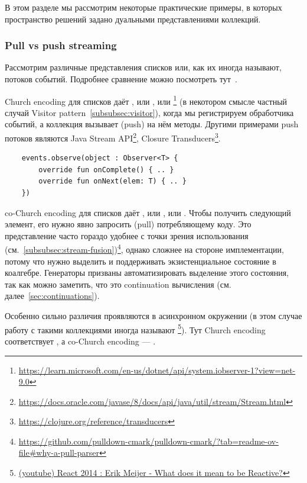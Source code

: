 В этом разделе мы рассмотрим некоторые практические примеры, в которых пространство решений задано дуальными представлениями коллекций.

\subsubsection{Pull vs push streaming} \label{subsubsec:push-pull}

Рассмотрим различные представления списков или, как их иногда называют, потоков событий.
Подробнее сравнение можно посмотреть тут~\cite[параграф 3]{kiselyov2017stream}.

Church encoding для списков даёт , или , или \footnote{\url{https://learn.microsoft.com/en-us/dotnet/api/system.iobserver-1?view=net-9.0}} (в некотором смысле частный случай Visitor pattern~\ref{subsubsec:visitor}), когда мы регистрируем обработчика событий, а коллекция вызывает (push) на нём методы.
Другими примерами push потоков являются Java Stream API\footnote{\url{https://docs.oracle.com/javase/8/docs/api/java/util/stream/Stream.html}}, Closure Transducers\footnote{\url{https://clojure.org/reference/transducers}}.
\begin{verbatim}
    events.observe(object : Observer<T> {
        override fun onComplete() { .. }
        override fun onNext(elem: T) { .. }
    })
\end{verbatim}

co-Church encoding для списков даёт , или , или .
Чтобы получить следующий элемент, его нужно явно запросить (pull) потребляющему коду.
Это представление часто гораздо удобнее с точки зрения использования (см.~\ref{subsubsec:stream-fusion})\footnote{\url{https://github.com/pulldown-cmark/pulldown-cmark/?tab=readme-ov-file\#why-a-pull-parser}}, однако сложнее на стороне имплементации, потому что нужно выделить и поддерживать экзистенциальное состояние в коалгебре.
Генераторы призваны автоматизировать выделение этого состояния, так как можно заметить, что это continuation вычисления (см. далее~\ref{sec:continuations}).

Особенно сильно различия проявляются в асинхронном окружении (в этом случае работу с такими коллекциями иногда называют \footnote{\href{https://youtu.be/sTSQlYX5DU0?si=Xhfi62ScXHBBjdBx}{(youtube) React 2014 : Erik Meijer - What does it mean to be Reactive?}}).
Тут Church encoding соответствует , а co-Church encoding --- .

